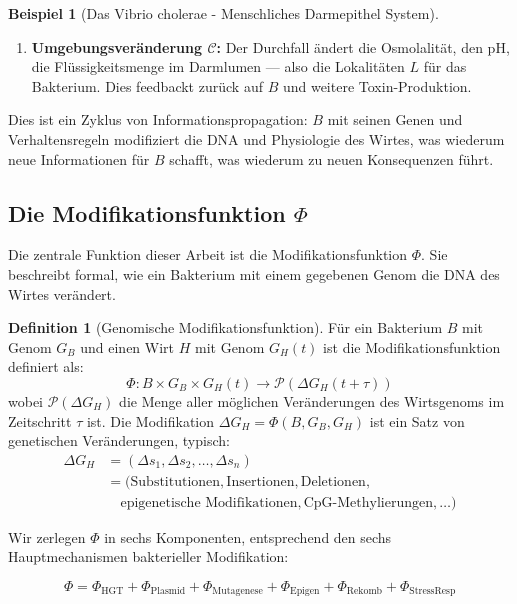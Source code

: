 \documentclass[a4paper,12pt]{article}
\theoremstyle{definition}
\newtheorem{definition}{Definition}
\newtheorem{beispiel}{Beispiel}
\begin{document}
\begin{beispiel}[Das Vibrio cholerae - Menschliches Darmepithel System]
\begin{enumerate}
    \item \textbf{Umgebungsveränderung $\mathcal{C}$:} Der Durchfall ändert die Osmolalität, den pH, die Flüssigkeitsmenge im Darmlumen --- also die Lokalitäten $L$ für das Bakterium. Dies feedbackt zurück auf $B$ und weitere Toxin-Produktion.
\end{enumerate}

Dies ist ein Zyklus von Informationspropagation: $B$ mit seinen Genen und Verhaltensregeln modifiziert die DNA und Physiologie des Wirtes, was wiederum neue Informationen für $B$ schafft, was wiederum zu neuen Konsequenzen führt.
\end{beispiel}

\subsection{Die Modifikationsfunktion $\Phi$}

Die zentrale Funktion dieser Arbeit ist die Modifikationsfunktion $\Phi$. Sie beschreibt formal, wie ein Bakterium mit einem gegebenen Genom die DNA des Wirtes verändert.

\begin{definition}[Genomische Modifikationsfunktion]
Für ein Bakterium $B$ mit Genom $G_B$ und einen Wirt $H$ mit Genom $G_H(t)$ ist die Modifikationsfunktion definiert als:
\[
\Phi: B \times G_B \times G_H(t) \to \mathcal{P}(\Delta G_H(t+\tau))
\]
wobei $\mathcal{P}(\Delta G_H)$ die Menge aller möglichen Veränderungen des Wirtsgenoms im Zeitschritt $\tau$ ist. Die Modifikation $\Delta G_H = \Phi(B, G_B, G_H)$ ist ein Satz von genetischen Veränderungen, typisch:
\begin{align}
\Delta G_H &= (\Delta s_1, \Delta s_2, \ldots, \Delta s_n) \\
&= \Big( \text{Substitutionen}, \text{Insertionen}, \text{Deletionen}, \\
&\quad \text{epigenetische Modifikationen}, \text{CpG-Methylierungen}, \ldots \Big)
\end{align}
\end{definition}

Wir zerlegen $\Phi$ in sechs Komponenten, entsprechend den sechs Hauptmechanismen bakterieller Modifikation:

\begin{equation}
\Phi = \Phi_{\text{HGT}} + \Phi_{\text{Plasmid}} + \Phi_{\text{Mutagenese}} + \Phi_{\text{Epigen}} + \Phi_{\text{Rekomb}} + \Phi_{\text{StressResp}}
\end{equation}
\end{document}
